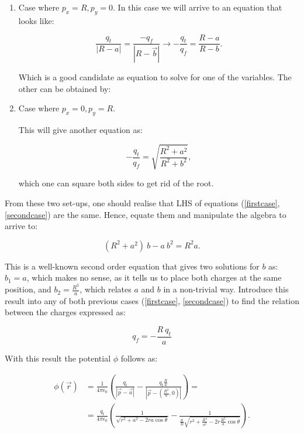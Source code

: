\begin{enumerate}
	\item Case where $p_{x} = R, p_{y}= 0$.
	In this case we will arrive to an equation that looks like:

	\begin{equation}\label{firstcase}
		\frac{q_{t}}{\left|R-a\right|} = \frac{-q_{f}}{\left|R-\vec{b}\right|} \rightarrow -\frac{q_{t}}{q_{f}} = \frac{R-a}{R-b}.
	\end{equation}

	Which is a good candidate as equation to solve for one of the variables. The other can be obtained by:

	\item Case where $p_{x} = 0, p_{y}= R$.
	
	This will give another equation as:

	\begin{equation}\label{secondcase}
		-\frac{q_{t}}{q_{f}} = \sqrt{\frac{R^{2}+a^{2}}{R^{2}+b^{2}}},
	\end{equation}

	which one can square both sides to get rid of the root.
\end{enumerate}

From these two set-ups, one should realise that LHS of equations (\ref{firstcase},\ref{secondcase}) are the same. Hence, equate them and manipulate the algebra to arrive to:

\begin{equation}
	\left(R^{2}+a^{2}\right)\: b - a \: b^{2} = R^{2} a.
\end{equation}

This is a well-known second order equation that gives two solutions for $b$ as: $b_{1} = a$, which makes no sense, as it tells us to place both charges at the same position, and $b_{2} = \tfrac{R^{2}}{a}$, which relates $a$ and $b$ in a non-trivial way. Introduce this result into any of both previous cases (\ref{firstcase}, \ref{secondcase}) to find the relation between the charges expressed as:

\begin{equation}
	q_{f} = - \frac{R \: q_{t}}{a}
\end{equation}

With this result the potential $\phi$ follows as:


\begin{align}
		\phi (\vec{r}) &= \frac{1}{4\pi \epsilon_{0}}\left(\frac{q_{t}}{\left|\vec{p}-\vec{a}\right|} - \frac{q_{t} \tfrac{R}{a}}{\left|\vec{p}- \left(\tfrac{R^{2}}{a},0\right)\right|}\right)=\\
		&=\frac{q_{t}}{4\pi \epsilon_{0}}\left(\frac{1}{\sqrt{r^{2}+a^{2}-2r a \cos \theta}} - \frac{1}{\tfrac{a}{R}\sqrt{r^{2}+\tfrac{R^{4}}{a^{2}}-2r \tfrac{R^{2}}{a} \cos \theta}}\right).
\end{align}


